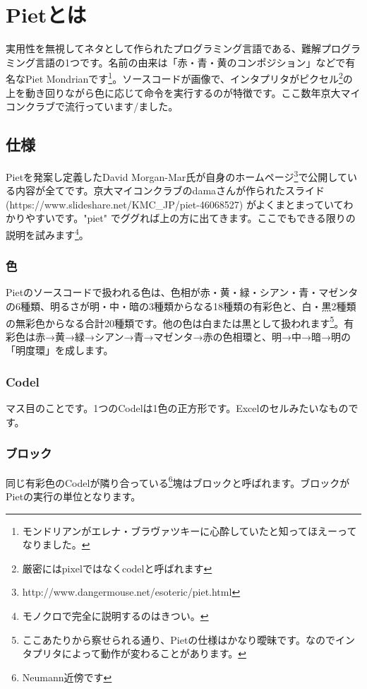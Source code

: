 ﻿

\section{Pietとは}
実用性を無視してネタとして作られたプログラミング言語である、難解プログラミング言語の1つです。名前の由来は「赤・青・黄のコンポジション」などで有名なPiet Mondrianです\footnote{モンドリアンがエレナ・ブラヴァツキーに心酔していたと知ってほえーってなりました。}。ソースコードが画像で、インタプリタがピクセル\footnote{厳密にはpixelではなくcodelと呼ばれます}の上を動き回りながら色に応じて命令を実行するのが特徴です。ここ数年京大マイコンクラブで流行っています/ました。

\subsection{仕様}
Pietを発案し定義したDavid Morgan-Mar氏が自身のホームページ\footnote{http://www.dangermouse.net/esoteric/piet.html}で公開している内容が全てです。京大マイコンクラブのdamaさんが作られたスライド (https://www.slideshare.net/KMC\_JP/piet-46068527) がよくまとまっていてわかりやすいです。"piet" でググれば上の方に出てきます。ここでもできる限りの説明を試みます\footnote{モノクロで完全に説明するのはきつい。}。

\subsubsection{色}
Pietのソースコードで扱われる色は、色相が赤・黄・緑・シアン・青・マゼンタの6種類、明るさが明・中・暗の3種類からなる18種類の有彩色と、白・黒2種類の無彩色からなる合計20種類です。他の色は白または黒として扱われます\footnote{ここあたりから察せられる通り、Pietの仕様はかなり曖昧です。なのでインタプリタによって動作が変わることがあります。}。有彩色は赤→黄→緑→シアン→青→マゼンタ→赤の色相環と、明→中→暗→明の「明度環」を成します。

\subsubsection{Codel}
マス目のことです。1つのCodelは1色の正方形です。Excelのセルみたいなものです。

\subsubsection{ブロック}
同じ有彩色のCodelが隣り合っている\footnote{Neumann近傍です}塊はブロックと呼ばれます。ブロックがPietの実行の単位となります。

